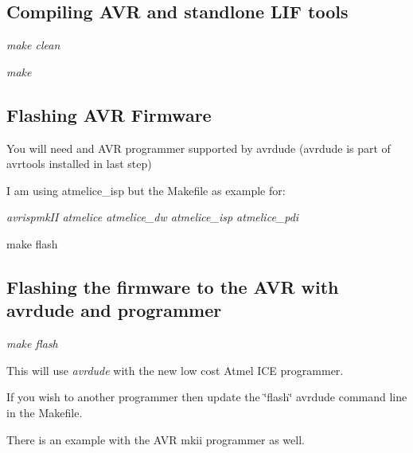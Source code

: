 \subsection*{Compiling A\+VR and standlone L\+IF tools}


\begin{DoxyItemize}
\item {\itshape make clean}
\item {\itshape make}
\end{DoxyItemize}

\subsection*{Flashing A\+VR Firmware}


\begin{DoxyItemize}
\item You will need and A\+VR programmer supported by avrdude (avrdude is part of avrtools installed in last step)
\begin{DoxyItemize}
\item I am using atmelice\+\_\+isp but the Makefile as example for\+:
\begin{DoxyItemize}
\item {\itshape avrispmk\+II atmelice atmelice\+\_\+dw atmelice\+\_\+isp atmelice\+\_\+pdi}
\end{DoxyItemize}
\end{DoxyItemize}
\item make flash
\end{DoxyItemize}

\subsection*{Flashing the firmware to the A\+VR with avrdude and programmer}


\begin{DoxyItemize}
\item {\itshape make flash}
\begin{DoxyItemize}
\item This will use {\itshape avrdude} with the new low cost Atmel I\+CE programmer.
\begin{DoxyItemize}
\item If you wish to another programmer then update the \char`\"{}flash\char`\"{} avrdude command line in the Makefile.
\item There is an example with the A\+VR mkii programmer as well.
\end{DoxyItemize}
\end{DoxyItemize}
\end{DoxyItemize}

